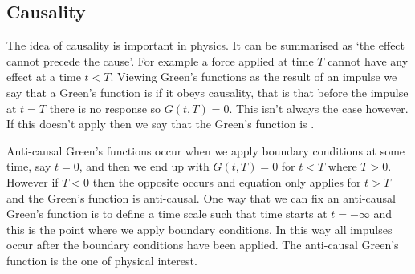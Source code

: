 \documentclass[a4paper]{article}
\begin{document}
    \subsection{Causality}
    The idea of causality is important in physics.
    It can be summarised as `the effect cannot precede the cause'.
    For example a force applied at time \(T\) cannot have any effect at a time \(t < T\).
    Viewing Green's functions as the result of an impulse we say that a Green's function is  if it obeys causality, that is that before the impulse at \(t = T\) there is no response so \(G(t, T) = 0\).
    This isn't always the case however.
    If this doesn't apply then we say that the Green's function is .
    
    Anti-causal Green's functions occur when we apply boundary conditions at some time, say \(t = 0\), and then we end up with \(G(t, T) = 0\) for \(t < T\) where \(T > 0\).
    However if \(T < 0\) then the opposite occurs and equation only applies for \(t > T\) and the Green's function is anti-causal.
    One way that we can fix an anti-causal Green's function is to define a time scale such that time starts at \(t = -\infty\) and this is the point where we apply boundary conditions.
    In this way all impulses occur after the boundary conditions have been applied.
    The anti-causal Green's function is the one of physical interest.
    
\end{document}
